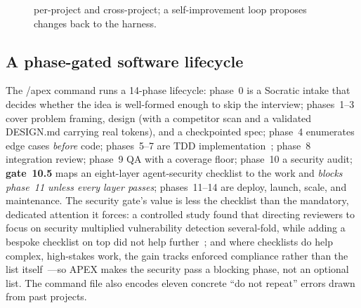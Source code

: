 \documentclass[sigconf,review,anonymous=false]{acmart}
\begin{document}
\begin{figure}[t]
{  per-project and cross-project; a self-improvement loop proposes changes back to
  the harness.}
  \label{fig:arch}
\end{figure}

\subsection{A phase-gated software lifecycle}
The \textsf{/apex} command runs a 14-phase lifecycle: phase~0 is a Socratic intake
that decides whether the idea is well-formed enough to skip the interview;
phases~1--3 cover problem framing, design (with a competitor scan and a validated
\textsf{DESIGN.md} carrying real tokens), and a checkpointed spec; phase~4
enumerates edge cases \emph{before} code; phases~5--7 are TDD
implementation~\cite{nagappan2008tdd,santos2020tddmeta};
phase~8 integration review; phase~9 QA with a coverage floor; phase~10 a security
audit; \textbf{gate~10.5} maps an eight-layer agent-security checklist to the work
and \emph{blocks phase~11 unless every layer passes}; phases~11--14 are deploy,
launch, scale, and maintenance. The security gate's value is less the checklist than
the mandatory, dedicated attention it forces: a controlled study found that directing
reviewers to focus on security multiplied vulnerability detection several-fold, while
adding a bespoke checklist on top did not help further~\cite{braz2022lessismore}; and
where checklists do help complex, high-stakes work, the gain tracks enforced
compliance rather than the list itself~\cite{borchard2012checklists}---so APEX makes
the security pass a blocking phase, not an optional list. The command file also encodes eleven concrete
``do not repeat'' errors drawn from past projects.
\end{document}
